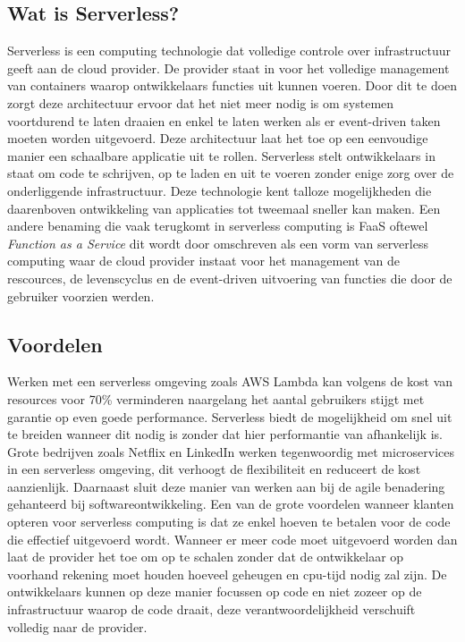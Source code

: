 \subsection{Wat is Serverless?}
Serverless is een computing technologie dat volledige controle over infrastructuur geeft aan de cloud provider. De provider staat in voor het volledige management van containers waarop ontwikkelaars functies uit kunnen voeren. Door dit te doen zorgt deze architectuur ervoor dat het niet meer nodig is om systemen voortdurend te laten draaien en enkel te laten werken als er event-driven taken moeten worden uitgevoerd. Deze architectuur laat het toe op een eenvoudige manier een schaalbare applicatie uit te rollen. Serverless stelt ontwikkelaars in staat om code te schrijven, op te laden en uit te voeren zonder enige zorg over de onderliggende infrastructuur. Deze technologie kent talloze mogelijkheden die \cite{Serverless2018}daarenboven ontwikkeling van applicaties tot tweemaal sneller kan maken. \autocite{Stigler,2017} Een andere benaming die vaak terugkomt in serverless computing is FaaS oftewel \textit{Function as a Service} dit wordt door \textcite{VanEyck (2018)} omschreven als een vorm van serverless computing waar de cloud provider instaat voor het management van de rescources, de levenscyclus en de event-driven uitvoering van functies die door de gebruiker voorzien werden.

\subsection{Voordelen}
Werken met een serverless omgeving zoals AWS Lambda kan volgens \autocite{Perez(2017)} de kost van resources voor 70\% verminderen naargelang het aantal gebruikers stijgt met garantie op even goede performance. Serverless biedt de mogelijkheid om snel uit te breiden wanneer dit nodig is zonder dat hier performantie van afhankelijk is. Grote bedrijven zoals Netflix en LinkedIn werken tegenwoordig met microservices in een serverless omgeving, dit verhoogt de flexibiliteit en reduceert de kost aanzienlijk. Daarnaast sluit deze manier van werken aan bij de agile benadering gehanteerd bij softwareontwikkeling. \autocite{Villamizar,2017} Een van de grote voordelen wanneer klanten opteren voor serverless computing is dat ze enkel hoeven te betalen voor de code die effectief uitgevoerd wordt. Wanneer er meer code moet uitgevoerd worden dan laat de provider het toe om op te schalen zonder dat de ontwikkelaar op voorhand rekening moet houden hoeveel geheugen en cpu-tijd nodig zal zijn. De ontwikkelaars kunnen op deze manier focussen op code en niet zozeer op de infrastructuur waarop de code draait, deze verantwoordelijkheid verschuift volledig naar de provider. \autocite{Savage,2018}

